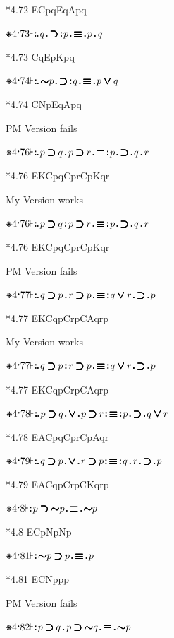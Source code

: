 \documentclass[12pt]{article}
\newcommand{\pmthm}{\mathpunct{\text{\scalebox{.5}[1]{$\boldsymbol\vdash$}}}} %
\newcommand{\pmast}{\text{\resizebox{!}{.75\height}{\ding{107}}}} %
\newcommand{\pmcdot}{\text{\raisebox{.05cm}{$\boldsymbol\cdot$}}} %
\newcommand{\pmd}{\hbox{\rule{.3ex}{.3ex}}} %
\newcommand{\pmdd}{\overset{\pmd}{\pmd}} %
\newcommand{\pmdot}{\mathinner{\pmd}}
\newcommand{\pmdott}{\mathinner{\pmdd}}
\newcommand{\pmdottt}{\mathinner{\pmdd\hspace{1pt}\pmd}}
\newcommand{\pmnot}{\mathord{\ooalign{$\boldsymbol{\sim}\mkern.5mu$\hidewidth\cr$\boldsymbol{\sim}$\cr\hidewidth$\mkern.5mu\boldsymbol{\sim}$}}}
\newcommand{\pmor}{\mathbin{\ooalign{$\boldsymbol{\vee}\mkern.5mu$\hidewidth\cr$\boldsymbol{\vee}$\cr\hidewidth$\mkern.5mu\boldsymbol{\vee}$}}}
\newcommand{\pmimp}{\mathbin{\ooalign{$\boldsymbol{\supset}\mkern.5mu$\hidewidth\cr$\boldsymbol{\supset}$\cr\hidewidth$\mkern.5mu\boldsymbol{\supset}$}}} %
\newcommand{\pmand}{\mathbin{\pmd}}%
\newcommand{\pmandd}{\mathbin{\pmdd}}
\newcommand{\pmiff}{\mathbin{\ooalign{$\boldsymbol{\equiv}\mkern.5mu$\hidewidth\cr$\boldsymbol{\equiv}$\cr\hidewidth$\mkern.5mu\boldsymbol{\equiv}$}}} %
\begin{document}
*4.72 ECpqEqApq

$\pmast 4 \pmcdot 73 \pmthm \pmdottt q \pmdot \pmimp \pmdott p \pmdot \pmiff \pmdot p \pmand q   $

*4.73 CqEpKpq

$\pmast 4 \pmcdot 74 \pmthm \pmdottt  \pmnot p \pmdot \pmimp \pmdott q \pmdot \pmiff \pmdot p \pmor q   $

*4.74 CNpEqApq

PM Version fails

$\pmast 4 \pmcdot 76 \pmthm \pmdottt p \pmimp q \pmand p \pmimp r \pmdot \pmiff \pmdott p \pmdot \pmimp \pmdot q \pmand r   $

*4.76 EKCpqCprCpKqr

My Version works

$\pmast 4 \pmcdot 76 \pmthm \pmdottt p \pmimp q \pmandd p \pmimp r \pmdot \pmiff \pmdott p \pmdot \pmimp \pmdot q \pmand r   $

*4.76 EKCpqCprCpKqr

PM Version fails

$\pmast 4 \pmcdot 77 \pmthm \pmdottt q \pmimp p \pmand r \pmimp p \pmdot \pmiff \pmdott q \pmor r \pmdot \pmimp \pmdot p   $

*4.77 EKCqpCrpCAqrp

My Version works

$\pmast 4 \pmcdot 77 \pmthm \pmdottt q \pmimp p \pmandd r \pmimp p \pmdot \pmiff \pmdott q \pmor r \pmdot \pmimp \pmdot p   $

*4.77 EKCqpCrpCAqrp

$\pmast 4 \pmcdot 78 \pmthm \pmdottt p \pmimp q \pmdot \pmor \pmdot p \pmimp r \pmdott \pmiff \pmdott p \pmdot \pmimp \pmdot q \pmor r   $

*4.78 EACpqCprCpAqr

$\pmast 4 \pmcdot 79 \pmthm \pmdottt q \pmimp p \pmdot \pmor \pmdot r \pmimp p \pmdott \pmiff \pmdott q \pmand r \pmdot \pmimp \pmdot p $

*4.79 EACqpCrpCKqrp

$\pmast 4 \pmcdot 8 \pmthm \pmdott p \pmimp \pmnot p \pmdot \pmiff \pmdot \pmnot p $

*4.8 ECpNpNp

$\pmast 4 \pmcdot 81 \pmthm \pmdott \pmnot p \pmimp p \pmdot \pmiff \pmdot p $

*4.81 ECNppp

PM Version fails

$\pmast 4 \pmcdot 82 \pmthm \pmdott p \pmimp q \pmand p \pmimp \pmnot q \pmdot \pmiff \pmdot \pmnot p $
\end{document}
